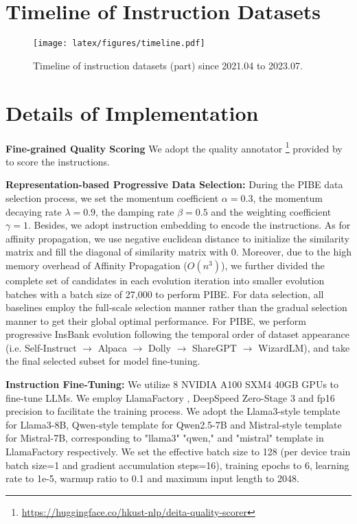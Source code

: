 \newpage

\appendix

\section{Timeline of Instruction Datasets}
\label{appendix: timeline}
\begin{figure}[htbp]
\begin{center}
\texttt{[image: latex/figures/timeline.pdf]}
\end{center}
\caption{Timeline of instruction datasets (part) since 2021.04 to 2023.07.} 
\label{fig: timeline}
\end{figure}

\section{Details of Implementation}
\label{appendixs: hyperparameters}
\textbf{Fine-grained Quality Scoring} We adopt the quality annotator \footnote{\url{https://huggingface.co/hkust-nlp/deita-quality-scorer}} provided by \citet{ds-deita} to score the instructions.

\textbf{Representation-based Progressive Data Selection:} During the PIBE data selection process, we set the momentum coefficient $\alpha=0.3$, the momentum decaying rate $\lambda=0.9$, the damping rate $\beta=0.5$ and the weighting coefficient $\gamma=1$. Besides, we adopt instruction embedding \citep{instruction_embedding} to encode the instructions. As for affinity propagation, we use negative euclidean distance to initialize the similarity matrix and fill the diagonal of similarity matrix with 0. Moreover, due to the high memory overhead of Affinity Propagation (\(O(n^3)\)), we further divided the complete set of candidates in each evolution iteration into smaller evolution batches with a batch size of 27,000 to perform PIBE. For data selection, all baselines employ the full-scale selection manner rather than the gradual selection manner to get their global optimal performance. For PIBE, we perform progressive InsBank evolution following the temporal order of dataset appearance (i.e. Self-Instruct $\rightarrow$ Alpaca $\rightarrow$ Dolly $\rightarrow$ ShareGPT $\rightarrow$ WizardLM), and take the final selected subset for model fine-tuning.

\textbf{Instruction Fine-Tuning:} We utilize 8 NVIDIA A100 SXM4 40GB GPUs to fine-tune LLMs. We employ LlamaFactory \citep{llamafactory}, DeepSpeed Zero-Stage 3 \citep{deepspeed} and fp16 precision to facilitate the training process. We adopt the Llama3-style template for Llama3-8B, Qwen-style template for Qwen2.5-7B and Mistral-style template for Mistral-7B, corresponding to "llama3" "qwen," and "mistral" template in LlamaFactory respectively. We set the effective batch size to 128 (per device train batch size=1 and gradient accumulation steps=16), training epochs to 6, learning rate to 1e-5, warmup ratio to 0.1 and maximum input length to 2048.


